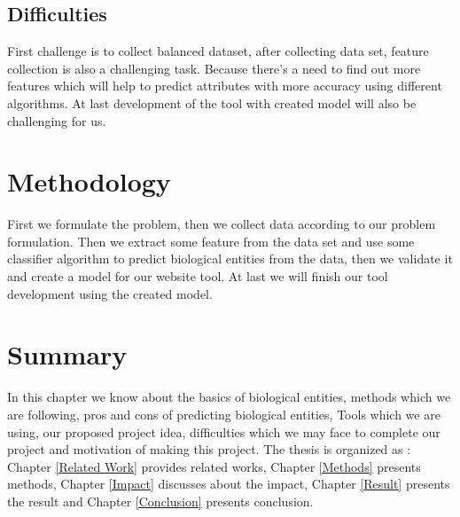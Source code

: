 \subsection{Difficulties}
First challenge is to collect balanced dataset, after collecting data set, feature collection is also a challenging task. Because there's a need to find out more features which will help to predict attributes with more accuracy using different algorithms. At last development of the tool with created model will also be challenging for us.

\section{Methodology}
First we formulate the problem, then we collect data according to our problem formulation. Then we extract some feature from the data set and use some classifier algorithm to predict biological entities from the data, then we validate it and create a model for our website tool. At last we will finish our tool development using the created model.



\section{Summary}
In this chapter we know about the basics of biological entities, methods which we are following, pros and cons of predicting biological entities, Tools which we are using, our proposed project idea, difficulties which we may face to complete our project and motivation of making this project. The thesis is organized as : Chapter \ref{Related Work} provides related works, Chapter \ref{Methods} presents methods, Chapter \ref{Impact} discusses about the impact, Chapter \ref{Result} presents the result and Chapter \ref{Conclusion} presents conclusion.

